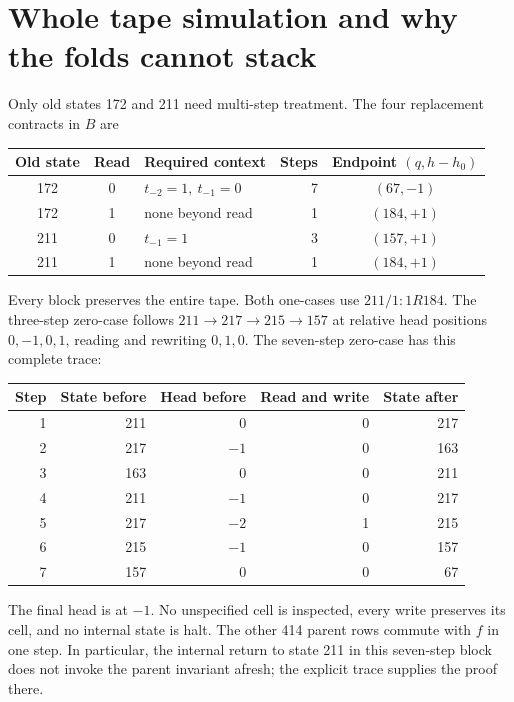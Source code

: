 \documentclass[11pt,letterpaper]{article}
\begin{document}
\section{Whole tape simulation and why the folds cannot stack}
Only old states 172 and 211 need multi-step treatment. The four replacement
contracts in $B$ are
\begin{center}\begin{tabular}{cclrc}\toprule
Old state & Read & Required context & Steps & Endpoint $(q,h-h_0)$\\\midrule
172 & 0 & $t_{-2}=1,\ t_{-1}=0$ & 7 & $(67,-1)$\\
172 & 1 & none beyond read & 1 & $(184,+1)$\\
211 & 0 & $t_{-1}=1$ & 3 & $(157,+1)$\\
211 & 1 & none beyond read & 1 & $(184,+1)$\\\bottomrule
\end{tabular}\end{center}
Every block preserves the entire tape. Both one-cases use $211/1:1R184$.
The three-step zero-case follows
$211\to217\to215\to157$ at relative head positions $0,-1,0,1$,
reading and rewriting $0,1,0$. The seven-step zero-case has this complete trace:
\begin{center}\begin{tabular}{rrrrr}\toprule
Step & State before & Head before & Read and write & State after\\\midrule
1&211&0&0&217\\
2&217&$-1$&0&163\\
3&163&0&0&211\\
4&211&$-1$&0&217\\
5&217&$-2$&1&215\\
6&215&$-1$&0&157\\
7&157&0&0&67\\\bottomrule
\end{tabular}\end{center}
The final head is at $-1$. No unspecified cell is inspected, every write
preserves its cell, and no internal state is halt. The other 414 parent rows
commute with $f$ in one step. In particular, the internal return to state 211
in this seven-step block does not invoke the parent invariant afresh; the
explicit trace supplies the proof there.
\end{document}
